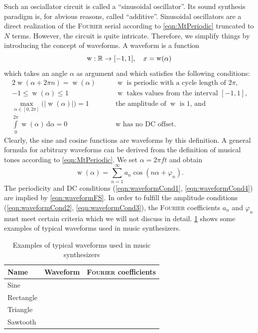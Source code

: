 \documentclass[a4paper]{article}
\def\d{\mathrm{d}}
\newcommand\person[1]{\textsc{#1}}
\newcommand{\workOn}{\color{Salmon!80!black}}
\newcommand{\workOff}{\color{black}}
\newcommand{\TODO}[1]{%
  \fboxsep=1pt\fboxrule=1pt\fcolorbox{yellow}{white}{[\textbf{TODO:~}#1]}%
}
\DeclareMathOperator{\wf}{w}
\begin{document}
Such an osciallator circuit is called a ``sinusoidal oscillator''. Its sound
synthesis paradigm is, for abvious reasons, called ``additive''. Sinusoidal
oscillators are a direct realization of the \person{Fourier} serial according to
\cref{eqn:MtPeriodic} truncated to $N$ terms. However, the circuit is quite
intricate. Therefore, we simplify things by introducing the concept of
waveforms. A waveform is a function
\begin{equation}
  \notag
  \wf: \mathbb{R}\to[-1,1],
  \quad x=\wf(\alpha)
\end{equation}
which takes an angle $\alpha$ as argument and which satisfies the following 
conditions:
\begin{alignat}{2}
  \label{eqn:waveformCond1}
  \wf(\alpha+2\pi n)=\wf(\alpha) 
  & \qquad\text{$\wf$ is periodic with a cycle length of $2\pi$,}
\\
  \label{eqn:waveformCond2}
  -1\leq\wf(\alpha)\leq 1
  & \qquad\text{$\wf$ takes values from the interval $[-1,1]$,}
\\
  \label{eqn:waveformCond3}
  \max\limits_{\alpha\in[0,2\pi]}\big(|\wf(\alpha)|\big) = 1
  & \qquad\text{the amplitude of $\wf$ is $1$, and}
\\
  \label{eqn:waveformCond4}
  \int\limits_{0}^{2\pi}\wf(\alpha)\,\d\alpha = 0
  & \qquad\text{$\wf$ has no DC offset.}
\end{alignat}
Clearly, the sine and cosine functions are waveforms by this definition.
A general formula for arbitrary waveforms can be derived from the definition of
musical tones according to \cref{eqn:MtPeriodic}. We set $\alpha = 2\pi ft$
and obtain
\begin{equation}
  \label{eqn:waveformFS}
  \wf(\alpha) = \sum\limits_{n=1}^\infty a_n\cos(n\alpha+\varphi_n).
\end{equation}
The periodicity and DC conditions (\ref{eqn:waveformCond1},
\ref{eqn:waveformCond4}) are implied by \cref{eqn:waveformFS}.
In order to fulfill the amplitude conditions (\ref{eqn:waveformCond2},
\ref{eqn:waveformCond3}), the \person{Fourier} coefficients $a_n$ and
$\varphi_n$ must meet certain criteria which we will not discuss in detail.
\cref{tab:waveforms} shows some examples of typical waveforms used in music
synthesizers.
%
\begin{table}
\workOn
\centering
\begin{tabular}{lll}\toprule
  Name & Waveform & \person{Fourier} coefficients
\\\midrule
  Sine & \TODO{\ldots}
\\
  Rectangle & \TODO{\ldots}
\\
  Triangle & \TODO{\ldots}
\\
  Sawtooth & \TODO{\ldots}
\\\bottomrule
\end{tabular}
\caption{Examples of typical waveforms used in music synthesizers}
\label{tab:waveforms}
\workOff
\end{table}
\end{document}

